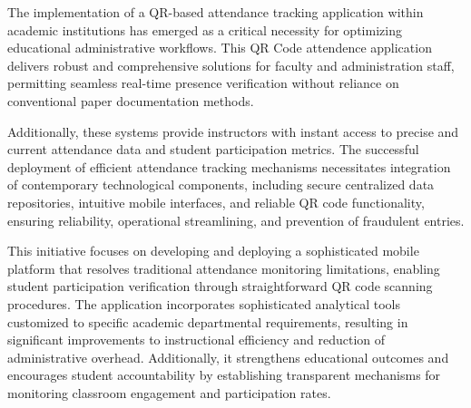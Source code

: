 \documentclass[12pt,a4paper]{report}
\begin{document}
\begin{Summary}
The implementation of a QR-based attendance tracking application within academic institutions has emerged as a critical necessity for optimizing educational administrative workflows. This QR Code attendence application delivers robust and comprehensive solutions for faculty and administration staff, permitting seamless real-time presence verification without reliance on conventional paper documentation methods.

Additionally, these systems provide instructors with instant access to precise and current attendance data and student participation metrics. The successful deployment of efficient attendance tracking mechanisms necessitates integration of contemporary technological components, including secure centralized data repositories, intuitive mobile interfaces, and reliable QR code functionality, ensuring reliability, operational streamlining, and prevention of fraudulent entries.

This initiative focuses on developing and deploying a sophisticated mobile platform that resolves traditional attendance monitoring limitations, enabling student participation verification through straightforward QR code scanning procedures. The application incorporates sophisticated analytical tools customized to specific academic departmental requirements, resulting in significant improvements to instructional efficiency and reduction of administrative overhead. Additionally, it strengthens educational outcomes and encourages student accountability by establishing transparent mechanisms for monitoring classroom engagement and participation rates.
\end{Summary}


\newpage
\newenvironment{ملخص}{
    \newpage
    \phantomsection
    \addcontentsline{toc}{chapter}{ملخص}
    \begin{center}
        {\color{mintgreen} \rule{\textwidth}{2pt} }\\[0.3cm]
        {\Large \textbf{الملخص}}\\[0.3cm]
        {\color{mintgreen} \rule{0.8\textwidth}{1.5pt} }
    \end{center}
    \vspace{0.5cm}
    \noindent
}{
    \vspace{0.5cm}
    \begin{center}
        {\color{mintgreen} \rule{0.8\textwidth}{1.5pt} }\\[0.3cm]
        {\color{mintgreen} \rule{\textwidth}{2pt} }
    \end{center}
}
\end{document}
